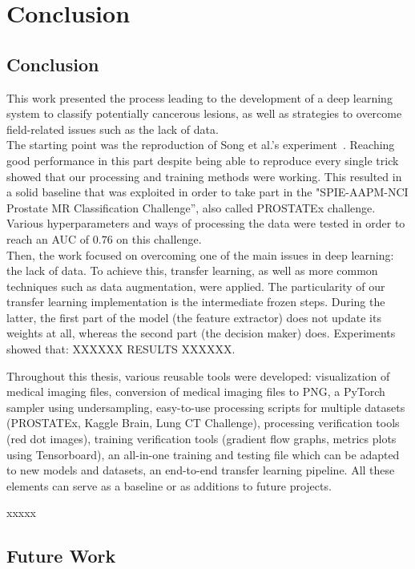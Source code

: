 
\chapter{Conclusion}
\label{ch:conclusions}

\section{Conclusion}
This work presented the process leading to the development of a deep learning system to classify potentially cancerous lesions, as well as strategies to overcome field-related issues such as the lack of data.\\
The starting point was the reproduction of Song et al.'s experiment~\cite{07}. Reaching good performance in this part despite being able to reproduce every single trick showed that our processing and training methods were working. This resulted in a solid baseline that was exploited in order to take part in the "SPIE-AAPM-NCI Prostate MR Classification Challenge”, also called PROSTATEx challenge. Various hyperparameters and ways of processing the data were tested in order to reach an AUC of $0.76$ on this challenge.\\
Then, the work focused on overcoming one of the main issues in deep learning: the lack of data. To achieve this, transfer learning, as well as more common techniques such as data augmentation, were applied. The particularity of our transfer learning implementation is the intermediate frozen steps. During the latter, the first part of the model (the feature extractor) does not update its weights at all, whereas the second part (the decision maker) does. Experiments showed that: XXXXXX RESULTS XXXXXX.

Throughout this thesis, various reusable tools were developed: visualization of medical imaging files, conversion of medical imaging files to PNG, a PyTorch sampler using undersampling, easy-to-use processing scripts for multiple datasets (PROSTATEx, Kaggle Brain, Lung CT Challenge), processing verification tools (red dot images), training verification tools (gradient flow graphs, metrics plots using Tensorboard), an all-in-one training and testing file which can be adapted to new models and datasets, an end-to-end transfer learning pipeline. All these elements can serve as a baseline or as additions to future projects. 

xxxxx


\section{Future Work}

